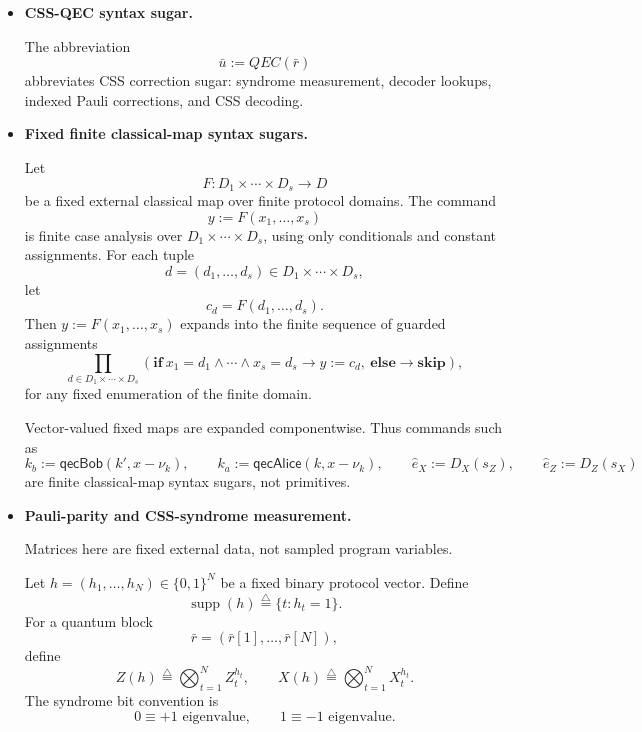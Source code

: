 \documentclass[acmsmall,screen,review,anonymous,nonacm]{acmart}
\theoremstyle{defn_style}
\begin{document}
\begin{itemize}
It interleaves \(g_0,g_1\) according to \(f\), preserving source order.

The package notation
\[
\mathcal P
:=
\mathbf{merge}_{f}^{N}\ \mathbf{from}\ J\ \mathbf{for}\ \mathcal P_0,\mathcal P_1
\]
is componentwise.

\(\mathbf{merge}_{f}\) constructs descriptor views, not value/state copies.
    
    \item \textbf{CSS-QEC syntax sugar.}

    The abbreviation
    \[
    \bar u:=QEC(\bar r)
    \]
    abbreviates CSS correction sugar:
    syndrome measurement, decoder lookups, indexed Pauli corrections, and CSS
    decoding.


    \item \textbf{Fixed finite classical-map syntax sugars.}

    Let
    \[
    F:D_1\times\cdots\times D_s\to D
    \]
    be a fixed external classical map over finite protocol domains. The command
    \[
    y:=F(x_1,\ldots,x_s)
    \]
    is finite case analysis over \(D_1\times\cdots\times D_s\), using only
    conditionals and constant assignments. For each tuple
    \[
    d=(d_1,\ldots,d_s)\in D_1\times\cdots\times D_s,
    \]
    let
    \[
    c_d=F(d_1,\ldots,d_s).
    \]
    Then \(y:=F(x_1,\ldots,x_s)\) expands into the finite sequence of guarded
    assignments
    \[
    \prod_{d\in D_1\times\cdots\times D_s}
    \left(
    \mathbf{if}\ x_1=d_1\land\cdots\land x_s=d_s
    \rightarrow y:=c_d,
    \ \mathbf{else}\rightarrow\mathbf{skip}
    \right),
    \]
    for any fixed enumeration of the finite domain.

    Vector-valued fixed maps are expanded componentwise. Thus commands such as
    \[
    k_b:=\mathsf{qecBob}(k',x-\nu_k),
    \qquad
    k_a:=\mathsf{qecAlice}(k,x-\nu_k),
    \qquad
    \hat e_X:=D_X(s_Z),
    \qquad
    \hat e_Z:=D_Z(s_X)
    \]
    are finite classical-map syntax sugars, not primitives.

    \item \textbf{Pauli-parity and CSS-syndrome measurement.}
    
    Matrices here are fixed external data, not sampled program variables.
    
    Let \(h=(h_1,\ldots,h_N)\in\{0,1\}^{N}\) be a fixed binary protocol vector.
    Define
    \[
    \operatorname{supp}(h)
    \stackrel{\triangle}{=}
    \{t: h_t=1\}.
    \]
    For a quantum block
    \[
    \bar r=(\bar r[1],\ldots,\bar r[N]),
    \]
    define
    \[
    Z(h)\stackrel{\triangle}{=}\bigotimes_{t=1}^{N}Z_t^{h_t},
    \qquad
    X(h)\stackrel{\triangle}{=}\bigotimes_{t=1}^{N}X_t^{h_t}.
    \]
    The syndrome bit convention is
    \[
    0\equiv +1\text{ eigenvalue},
    \qquad
    1\equiv -1\text{ eigenvalue}.
    \]
    

\end{itemize}
\end{document}
